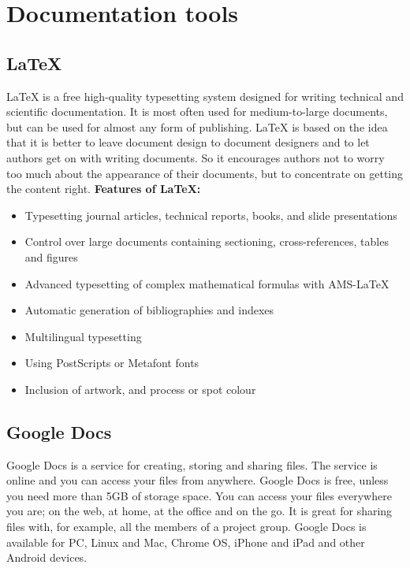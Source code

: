 \section{Documentation tools}

\subsection{LaTeX}
LaTeX is a free high-quality typesetting system designed for writing technical and scientific documentation. It is most often used for medium-to-large documents, but can be used for almost any form of publishing. 
\newline
\newline
LaTeX is based on the idea that it is better to leave document design to document designers and to let authors get on with writing documents. So it encourages authors not to worry too much about the appearance of their documents, but to concentrate on getting the content right\cite{bib:latex}.
\newline
\newline
\textbf{Features of LaTeX:}
\begin{itemize}
\item{}Typesetting journal articles, technical reports, books, and slide presentations
\item{}Control over large documents containing sectioning, cross-references, tables and figures
\item{}Advanced typesetting of complex mathematical formulas with AMS-LaTeX
\item{}Automatic generation of bibliographies and indexes
\item{}Multilingual typesetting
\item{}Using PostScripts or Metafont fonts
\item{}Inclusion of artwork, and process or spot colour
\end{itemize}

\subsection{Google Docs}
Google Docs is a service for creating, storing and sharing files. The service is online and you can access your files from anywhere. Google Docs is free, unless you need more than 5GB of storage space. You can access your files everywhere you are; on the web, at home, at the office and on the go. It is great for sharing files with, for example, all the members of a project group. Google Docs is available for PC, Linux and Mac, Chrome OS, iPhone and iPad and other Android devices.

